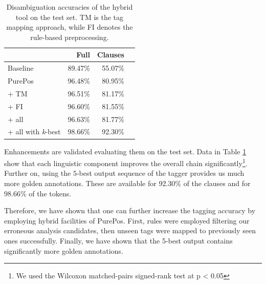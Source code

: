 \begin{table}[H]
\centering
\caption{Disambiguation accuracies of the hybrid tool on the test set. TM is the tag mapping approach, while FI denotes the rule-based preprocessing.}
\label{tab:oldhun-test}
\begin{tabular}{l r r r}
\hline
 & Full & Clauses  \\
\hline
Baseline  & 89.47\% & 55.07\% \\
PurePos  & 96.48\% & 80.95\% \\
\hspace{0.2cm} + TM  & 96.51\% & 81.17\% \\
\hspace{0.2cm} + FI  & 96.60\% & 81.55\% \\
\hspace{0.2cm} + all  & 96.63\% & 81.77\% \\
\hspace{0.2cm} + all with \emph{k}-best  & 98.66\% & 92.30\% \\
\hline
\end{tabular}
\end{table}
 
Enhancements are validated evaluating them on the test set.
Data in Table \ref{tab:oldhun-test} show that each linguistic component improves the overall chain significantly\footnote{We used the Wilcoxon matched-pairs signed-rank test at p < 0.05}.
Further on, using the $5$-best output sequence of the tagger provides us much more golden annotations. 
These are available for 92.30\% of the clauses and for 98.66\% of the tokens.

Therefore, we have shown that one can further increase the tagging accuracy by employing hybrid facilities of PurePos. 
First, rules were employed filtering our erroneous analysis candidates, then unseen tags were mapped to previously seen ones successfully. 
Finally, we have shown that the 5-best output contains significantly more golden annotations.



